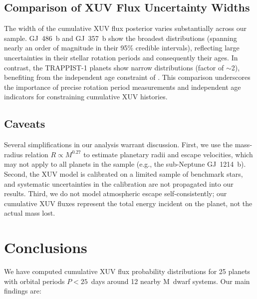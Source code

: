 \documentclass[twocolumn]{aastex631}
\begin{document}
\subsection{Comparison of XUV Flux Uncertainty Widths}

The width of the cumulative XUV flux posterior varies substantially across our
sample. GJ~486~b and GJ~357~b show the broadest distributions (spanning nearly
an order of magnitude in their 95\% credible intervals), reflecting large
uncertainties in their stellar rotation periods and consequently their ages.
In contrast, the TRAPPIST-1 planets show narrow distributions (factor of
$\sim$2), benefiting from the independent age constraint of
\citet{BurgasserMamajek2017}. This comparison underscores the importance of
precise rotation period measurements and independent age indicators for
constraining cumulative XUV histories.

\subsection{Caveats}

Several simplifications in our analysis warrant discussion. First, we use the
mass-radius relation $R \propto M^{0.27}$ to estimate planetary radii and
escape velocities, which may not apply to all planets in the sample (e.g.,
the sub-Neptune GJ~1214~b). Second, the \citet{Engle2024} XUV model is
calibrated on a limited sample of benchmark stars, and systematic uncertainties
in the calibration are not propagated into our results. Third, we do not model
atmospheric escape self-consistently; our cumulative XUV fluxes represent the
total energy incident on the planet, not the actual mass lost.

\section{Conclusions} \label{sec:conclusions}

We have computed cumulative XUV flux probability distributions for 25
planets with orbital periods $P < 25$~days around 12 nearby M~dwarf systems.
Our main findings are:
\end{document}

